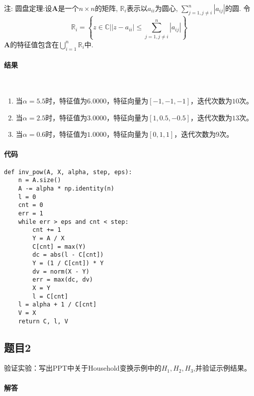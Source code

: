 注: 圆盘定理:设$\mathbf{A}$是一个$n\times n$的矩阵, $\mathbb{R}_i$表示以$a_{ii}$为圆心, $\sum_{j=1,j\neq i}^{n}\left|a_{ij} \right|$的圆. 
令$$\mathbb{R}_i = \left\{z \in \mathbb{C}\bigg | \left|z-a_{ii} \right| \leq \sum_{j=1,j\neq i}^{n} \left|a_{ij} \right| \right\}$$
$\mathbf{A}$的特征值包含在$\bigcup_{i=1}^n \mathbb{R}_i $中.

\paragraph{结果}
~\\
\begin{enumerate}
	\item 当$\alpha = 5.5$时，特征值为$6.0000$，特征向量为$[-1, -1, -1]$，迭代次数为$10$次。
	\item 当$\alpha = 2.5$时，特征值为$3.0000$，特征向量为$[1,0.5,-0.5]$，迭代次数为$13$次。
	\item 当$\alpha = 0.6$时，特征值为$1.0000$，特征向量为$[0,1,1]$，迭代次数为$9$次。
\end{enumerate}

\paragraph{代码}

\begin{verbatim}
def inv_pow(A, X, alpha, step, eps):
    n = A.size()
    A -= alpha * np.identity(n)
    l = 0
    cnt = 0
    err = 1
    while err > eps and cnt < step:
        cnt += 1
        Y = A / X
        C[cnt] = max(Y)
        dc = abs(l - C[cnt])
        Y = (1 / C[cnt]) * Y
        dv = norm(X - Y)
        err = max(dc, dv)
        X = Y
        l = C[cnt]
    l = alpha + 1 / C[cnt]
    V = X
    return C, l, V
\end{verbatim}



\subsection{题目2}

验证实验：写出PPT中关于Household变换示例中的$H_1,H_2,H_3$,并验证示例结果。


\paragraph{解答}

\newpage
